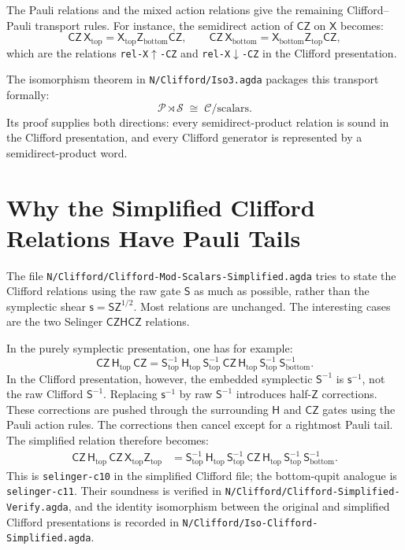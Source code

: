 \documentclass[a4paper,11pt]{article}
\newcommand{\xto}{\mathsf X}
\newcommand{\zto}{\mathsf Z}
\newcommand{\sGate}{\mathsf S}
\newcommand{\hGate}{\mathsf H}
\newcommand{\czGate}{\mathsf {CZ}}
\newcommand{\cliff}{\mathcal C}
\newcommand{\code}[1]{\texttt{#1}}
\begin{document}
The Pauli relations and the mixed action relations give the remaining
Clifford--Pauli transport rules.  For instance, the semidirect action
of $\czGate$ on $\xto$ becomes:
\[
  \czGate\,\xto_{\mathrm{top}}
  =
  \xto_{\mathrm{top}}\zto_{\mathrm{bottom}}\czGate,
  \qquad
  \czGate\,\xto_{\mathrm{bottom}}
  =
  \xto_{\mathrm{bottom}}\zto_{\mathrm{top}}\czGate,
\]
which are the relations \code{rel-X}\ensuremath{\uparrow}\code{-CZ}
and \code{rel-X}\ensuremath{\downarrow}\code{-CZ} in the
Clifford presentation.

The isomorphism theorem in \code{N/Clifford/Iso3.agda} packages this
transport formally:
\[
  \mathcal P \rtimes \mathcal S
  \;\cong\;
  \cliff/\text{scalars}.
\]
Its proof supplies both directions: every semidirect-product relation
is sound in the Clifford presentation, and every Clifford generator is
represented by a semidirect-product word.

\section{Why the Simplified Clifford Relations Have Pauli Tails}

The file \code{N/Clifford/Clifford-Mod-Scalars-Simplified.agda}
tries to state the Clifford relations using the raw gate $\sGate$ as
much as possible, rather than the symplectic shear
$\mathsf{s}=\sGate\zto^{1/2}$.  Most relations are unchanged.  The
interesting cases are the two Selinger $\czGate\hGate\czGate$
relations.

In the purely symplectic presentation, one has for example:
\[
  \czGate\,\hGate_{\mathrm{top}}\,\czGate
  =
  \sGate^{-1}_{\mathrm{top}}\,
  \hGate_{\mathrm{top}}\,
  \sGate^{-1}_{\mathrm{top}}\,
  \czGate\,
  \hGate_{\mathrm{top}}\,
  \sGate^{-1}_{\mathrm{top}}\,
  \sGate^{-1}_{\mathrm{bottom}} .
\]
In the Clifford presentation, however, the embedded symplectic
$\sGate^{-1}$ is $\mathsf{s}^{-1}$, not the raw Clifford
$\sGate^{-1}$.  Replacing $\mathsf{s}^{-1}$ by raw
$\sGate^{-1}$ introduces half-$\zto$ corrections.  These corrections
are pushed through the surrounding $\hGate$ and $\czGate$ gates using
the Pauli action rules.  The corrections then cancel except for a
rightmost Pauli tail.  The simplified relation therefore becomes:
\[
\begin{aligned}
  \czGate\,\hGate_{\mathrm{top}}\,\czGate\,
  \xto_{\mathrm{top}}\zto_{\mathrm{top}}
  &=
  \sGate^{-1}_{\mathrm{top}}\,
  \hGate_{\mathrm{top}}\,
  \sGate^{-1}_{\mathrm{top}}\,
  \czGate\,
  \hGate_{\mathrm{top}}\,
  \sGate^{-1}_{\mathrm{top}}\,
  \sGate^{-1}_{\mathrm{bottom}} .
\end{aligned}
\]
This is \code{selinger-c10} in the simplified Clifford file; the
bottom-qupit analogue is \code{selinger-c11}.  Their soundness is
verified in \code{N/Clifford/Clifford-Simplified-Verify.agda}, and
the identity isomorphism between the original and simplified
Clifford presentations is recorded in
\code{N/Clifford/Iso-Clifford-Simplified.agda}.
\end{document}
